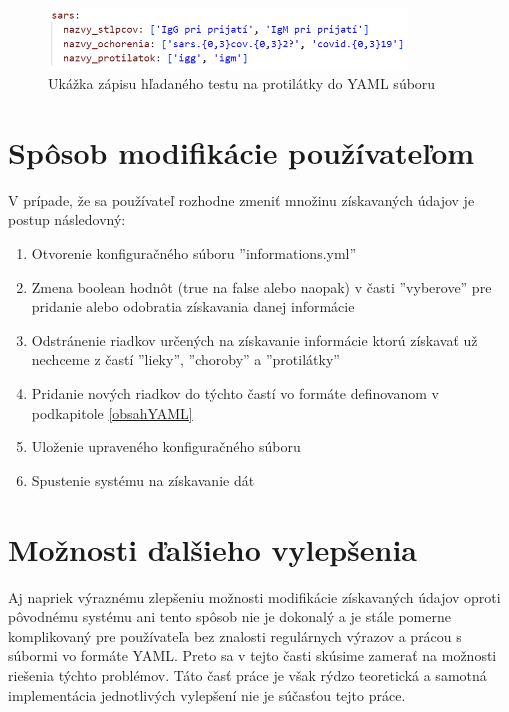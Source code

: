 \begin{figure}
	\centerline{\includegraphics[width=0.85\textwidth]{images/protilatky_yaml}}
	\caption[Ukážka zápisu testu na protilátky]{Ukážka zápisu hľadaného testu na protilátky do YAML súboru}
	\label{obr:protilatky_yaml}
\end{figure}

\section{Spôsob modifikácie používateľom}

V prípade, že sa používateľ rozhodne zmeniť množinu získavaných údajov je postup následovný:
\begin{enumerate}
	\item Otvorenie konfiguračného súboru ''informations.yml''
	\item Zmena boolean hodnôt (true na false alebo naopak) v časti ''vyberove'' pre pridanie alebo odobratia získavania danej informácie
	\item Odstránenie riadkov určených na získavanie informácie ktorú získavať už nechceme z častí ''lieky'', ''choroby'' a ''protilátky''
	\item Pridanie nových riadkov do týchto častí vo formáte definovanom v podkapitole \ref{obsahYAML}
	\item Uloženie upraveného konfiguračného súboru
	\item Spustenie systému na získavanie dát 
\end{enumerate}

\section{Možnosti ďalšieho vylepšenia}

Aj napriek výraznému zlepšeniu možnosti modifikácie získavaných údajov oproti pôvodnému systému ani tento spôsob nie je dokonalý a je stále pomerne komplikovaný pre používateľa bez znalosti regulárnych výrazov a prácou s súbormi vo formáte YAML. Preto sa v tejto časti skúsime zamerať na možnosti riešenia týchto problémov. Táto časť práce je však rýdzo teoretická a samotná implementácia jednotlivých vylepšení nie je súčasťou tejto práce. 

